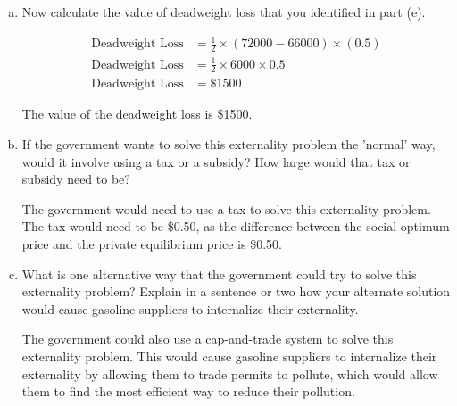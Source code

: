 \documentclass{article}
\begin{document}
\begin{enumerate}[(a)]

    \item Now calculate the value of deadweight loss that you identified in part (e).
    
    \begin{align*}
        \text{Deadweight Loss} &= \frac{1}{2} \times (72000 - 66000) \times (0.5)\\
        \text{Deadweight Loss} &= \frac{1}{2} \times 6000 \times 0.5\\
        \text{Deadweight Loss} &= \$1500
    \end{align*}

    The value of the deadweight loss is \$1500.

    \item If the government wants to solve this externality problem the 'normal' way, would it involve using a tax or a subsidy? How large would that tax or subsidy need to be?
    
    The government would need to use a tax to solve this externality problem. The tax would need to be \$0.50, as the difference between the social optimum price and the private equilibrium price is \$0.50.

    \item What is one alternative way that the government could try to solve this externality problem? Explain in a sentence or two how your alternate solution would cause gasoline suppliers to internalize their externality.
    
    The government could also use a cap-and-trade system to solve this externality problem. This would cause gasoline suppliers to internalize their externality by allowing them to trade permits to pollute, which would allow them to find the most efficient way to reduce their pollution.

\end{enumerate}
\end{document}
